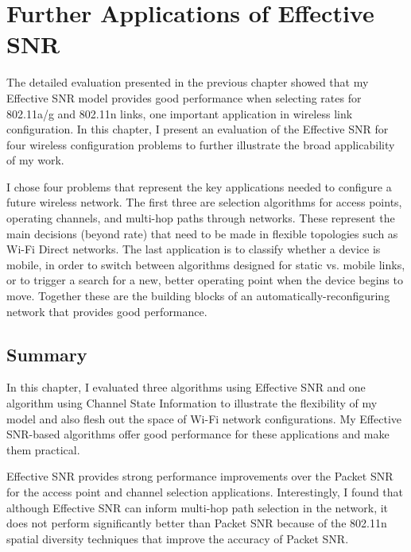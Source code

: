 \ifx\mainfile\undefined

\setcounter{chapter}{7} %
\fi

\cleardoublepage
\chapter{Further Applications of Effective SNR}
\label{chap:applications}

The detailed evaluation presented in the previous chapter showed that my Effective SNR model provides good performance when selecting rates for 802.11a/g and 802.11n links, one important application in wireless link configuration. In this chapter, I present an evaluation of the Effective SNR for four wireless configuration problems to further illustrate the broad applicability of my work.

I chose four problems that represent the key applications needed to configure a future wireless network. The first three are selection algorithms for access points, operating channels, and multi-hop paths through networks. These represent the main decisions (beyond rate) that need to be made in flexible topologies such as Wi-Fi Direct networks. The last application is to classify whether a device is mobile, in order to switch between algorithms designed for static vs. mobile links, or to trigger a search for a new, better operating point when the device begins to move. Together these are the building blocks of an automatically-reconfiguring network that provides good performance.






\section{Summary}
In this chapter, I evaluated three algorithms using Effective SNR and one algorithm using Channel State Information to illustrate the flexibility of my model and also flesh out the space of Wi-Fi network configurations. My Effective SNR-based algorithms offer good performance for these applications and make them practical.

Effective SNR provides strong performance improvements over the Packet SNR for the access point and channel selection applications. Interestingly, I found that although Effective SNR can inform multi-hop path selection in the network, it does not perform significantly better than Packet SNR because of the 802.11n spatial diversity techniques that improve the accuracy of Packet SNR.

